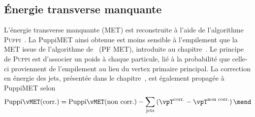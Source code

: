 \subsection{Énergie transverse manquante}\label{chapter-HTT_analysis-section-objects-MET}
L'énergie transverse manquante (MET) est reconstruite à l'aide de l'algorithme \textsc{Puppi}~\cite{PUPPI}.
La \og PuppiMET \fg{} ainsi obtenue est moins sensible à l'empilement que la MET issue de l'algorithme de \PF\ (PF MET), introduite au chapitre~.
Le principe de \textsc{Puppi} est d'associer un poids à chaque particule, lié à la probabilité que celle-ci proviennent de l'empilement au lieu du vertex primaire principal.
La correction en énergie des jets, présentée dans le chapitre~, est également propagée à PuppiMET selon
\begin{equation}
\text{Puppi}\vMET(\text{corr.}) = \text{Puppi}\vMET(\text{non corr.}) - \sum_\text{jets} \left( \vpT^\text{corr.} - \vpT^\text{non corr.} \right) \mend
\end{equation}